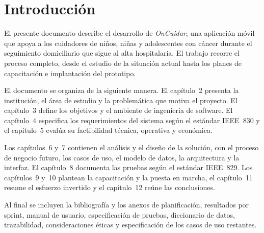 \chapter[Introducción]{Introducción}

El presente documento describe el desarrollo de \emph{OnCuidar}, una aplicación
móvil que apoya a los cuidadores de niños, niñas y adolescentes con cáncer
durante el seguimiento domiciliario que sigue al alta hospitalaria. El trabajo
recorre el proceso completo, desde el estudio de la situación actual hasta los
planes de capacitación e implantación del prototipo.

El documento se organiza de la siguiente manera. El capítulo~2 presenta la
institución, el área de estudio y la problemática que motiva el proyecto. El
capítulo~3 define los objetivos y el ambiente de ingeniería de software. El
capítulo~4 especifica los requerimientos del sistema según el estándar
IEEE~830 y el capítulo~5 evalúa su factibilidad técnica, operativa y económica.

Los capítulos~6 y~7 contienen el análisis y el diseño de la solución, con el
proceso de negocio futuro, los casos de uso, el modelo de datos, la arquitectura
y la interfaz. El capítulo~8 documenta las pruebas según el estándar IEEE~829.
Los capítulos~9 y~10 plantean la capacitación y la puesta en marcha, el
capítulo~11 resume el esfuerzo invertido y el capítulo~12 reúne las conclusiones.

Al final se incluyen la bibliografía y los anexos de planificación, resultados
por sprint, manual de usuario, especificación de pruebas, diccionario de datos,
trazabilidad, consideraciones éticas y especificación de los casos de uso
restantes.
